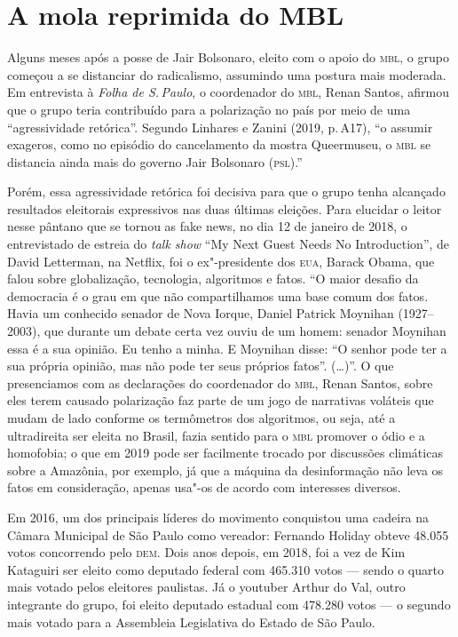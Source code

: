 \section{A mola reprimida do MBL}

Alguns meses após a posse de Jair Bolsonaro, eleito com o apoio do \textsc{mbl},
o grupo começou a se distanciar do radicalismo, assumindo uma postura
mais moderada. Em entrevista à \textit{Folha de S.\,Paulo}, o coordenador
do \textsc{mbl}, Renan Santos, afirmou que o grupo teria contribuído para a
polarização no país por meio de uma ``agressividade retórica''. Segundo
Linhares e Zanini (2019, p.\,A17), ``o assumir exageros, como no episódio
do cancelamento da mostra Queermuseu, o \textsc{mbl} se distancia ainda mais do
governo Jair Bolsonaro (\textsc{psl}).''

Porém, essa agressividade retórica foi decisiva para que o grupo tenha
alcançado resultados eleitorais expressivos nas duas últimas eleições.
Para elucidar o leitor nesse pântano que se tornou as fake news, no dia
12 de janeiro de 2018, o entrevistado de estreia do \textit{talk show} ``My Next
Guest Needs No Introduction'', de David Letterman, na Netflix, foi o
ex"-presidente dos \textsc{eua}, Barack Obama, que falou sobre globalização,
tecnologia, algoritmos e fatos. ``O maior desafio da democracia é o grau
em que não compartilhamos uma base comum dos fatos. Havia um conhecido
senador de Nova Iorque, Daniel Patrick Moynihan (1927--2003), que durante
um debate certa vez ouviu de um homem: senador Moynihan essa é a sua
opinião. Eu tenho a minha. E Moynihan disse: ``O senhor pode ter a sua
própria opinião, mas não pode ter seus próprios fatos''. (\ldots{})''. O que
presenciamos com as declarações do coordenador do \textsc{mbl}, Renan Santos,
sobre eles terem causado polarização faz parte de um jogo de narrativas
voláteis que mudam de lado conforme os termômetros dos algoritmos, ou
seja, até a ultradireita ser eleita no Brasil, fazia sentido para o \textsc{mbl}
promover o ódio e a homofobia; o que em 2019 pode ser facilmente trocado
por discussões climáticas sobre a Amazônia, por exemplo, já que a
máquina da desinformação não leva os fatos em consideração, apenas
usa"-os de acordo com interesses diversos.

Em 2016, um dos principais líderes do movimento conquistou uma cadeira
na Câmara Municipal de São Paulo como vereador: Fernando Holiday obteve
48.055 votos concorrendo pelo \textsc{dem}. Dois anos depois, em 2018, foi a vez
de Kim Kataguiri ser eleito como deputado federal com 465.310 votos ---
sendo o quarto mais votado pelos eleitores paulistas. Já o youtuber
Arthur do Val, outro integrante do grupo, foi eleito deputado estadual
com 478.280 votos --- o segundo mais votado para a Assembleia Legislativa
do Estado de São Paulo.

